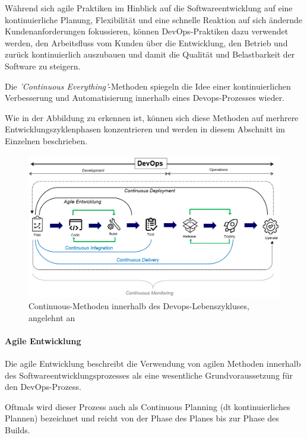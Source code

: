 Während sich agile Praktiken im Hinblick auf die Softwareentwicklung auf eine kontinuierliche Planung, Flexibilität und eine schnelle Reaktion auf sich ändernde Kundenanforderungen fokussieren, können DevOps-Praktiken dazu verwendet werden, den Arbeitsfluss vom Kunden über die Entwicklung, den Betrieb und zurück kontinuierlich auszubauen und damit die Qualität und Belastbarkeit der Software zu steigern. \cite{fitzgerald_continuous_2014} \cite[S. 264]{tokarski_strategische_2018}

Die \textit{'Continuous Everything'}-Methoden spiegeln die Idee einer kontinuierlichen Verbesserung und Automatisierung innerhalb eines Devops-Prozesses wieder. 

Wie in der Abbildung zu erkennen ist, können sich diese Methoden auf merhrere Entwicklungszyklenphasen konzentrieren und werden in diesem Abschnitt im Einzelnen beschrieben.  

\begin{figure}[h]
    \centering
    \includegraphics[scale=0.6]{Bilder/Continuous Everything.png}
    \caption{Continuous-Methoden innerhalb des Devops-Lebenszykluses, angelehnt an \cite[S. 16]{halstenberg_devops_2020}}
\end{figure}

\paragraph{Agile Entwicklung}
Die agile Entwicklung beschreibt die Verwendung von agilen Methoden innerhalb des Softwareentwicklungsprozesses als eine wesentliche Grundvoraussetzung für den DevOps-Prozess. 

Oftmals wird dieser Prozess auch als Continuous Planning (dt kontinuierliches Plannen) bezeichnet und reicht von der Phase des Planes bis zur Phase des Builds. \cite{fitzgerald_continuous_2014} 

